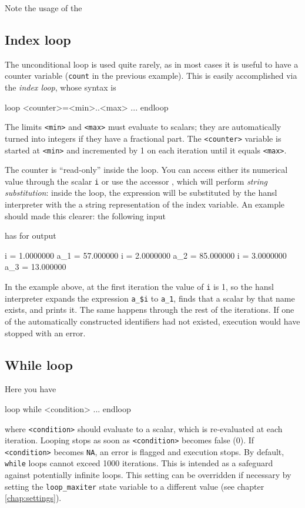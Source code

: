 Note the usage of the 
\subsection{Index loop}

The unconditional loop is used quite rarely, as in most cases it is
useful to have a counter variable (\texttt{count} in the previous
example). This is easily accomplished via the \emph{index loop}, whose
syntax is
\begin{code}
loop <counter>=<min>..<max>
   ...
endloop
\end{code}
The limits \texttt{<min>} and \texttt{<max>} must evaluate to scalars;
they are automatically turned into integers if they have a fractional
part. The \texttt{<counter>} variable is started at \texttt{<min>} and
incremented by 1 on each iteration until it equals \texttt{<max>}.

The counter is ``read-only'' inside the loop. You can access either
its numerical value through the scalar \texttt{i} or use the accessor
, which will perform \emph{string substitution}: inside the
loop, the expression  will be substituted by the hansl
interpreter with the a string representation of the index variable. An
example should made this clearer: the following input
has for output
\begin{code}
    i = 1.0000000
  a_1 = 57.000000
    i = 2.0000000
  a_2 = 85.000000
    i = 3.0000000
  a_3 = 13.000000
\end{code}

In the example above, at the first iteration the value of \texttt{i}
is 1, so the hansl interpreter expands the expression \verb|a_$i| to
\verb|a_1|, finds that a scalar by that name exists, and prints
it. The same happens through the rest of the iterations. If one of the
automatically constructed identifiers had not existed, execution would
have stopped with an error.

\subsection{While loop}

Here you have
\begin{code}
loop while <condition>
   ...
endloop
\end{code}
where \texttt{<condition>} should evaluate to a scalar, which is
re-evaluated at each iteration. Looping stops as soon as
\texttt{<condition>} becomes false (0). If \texttt{<condition>}
becomes \texttt{NA}, an error is flagged and execution stops.  By
default, \texttt{while} loops cannot exceed 1000 iterations. This is
intended as a safeguard against potentially infinite loops. This
setting can be overridden if necessary by setting the
\texttt{loop\_maxiter} state variable to a different value (see
chapter \ref{chap:settings}).

